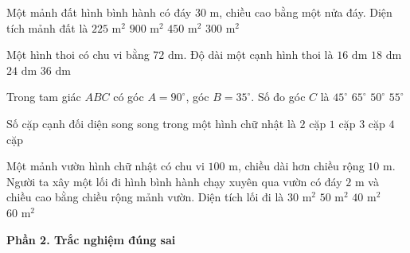 \begin{ex} %
Một mảnh đất hình bình hành có đáy $30\text{ m}$, chiều cao bằng một nửa đáy. Diện tích mảnh đất là
\choice
{$225\text{ m}^2$}
{$900\text{ m}^2$}
{\True $450\text{ m}^2$}
{$300\text{ m}^2$}
\end{ex}

\begin{ex} %
Một hình thoi có chu vi bằng $72\text{ dm}$. Độ dài một cạnh hình thoi là
\choice
{$16\text{ dm}$}
{\True $18\text{ dm}$}
{$24\text{ dm}$}
{$36\text{ dm}$}
\end{ex}

\begin{ex} %
Trong tam giác $ABC$ có góc $A = 90^\circ$, góc $B = 35^\circ$. Số đo góc $C$ là
\choice
{$45^\circ$}
{$65^\circ$}
{$50^\circ$}
{\True $55^\circ$}
\end{ex}

\begin{ex} %
Số cặp cạnh đối diện song song trong một hình chữ nhật là
\choice
{\True $2$ cặp}
{$1$ cặp}
{$3$ cặp}
{$4$ cặp}
\end{ex}

\begin{ex} %
Một mảnh vườn hình chữ nhật có chu vi $100\text{ m}$, chiều dài hơn chiều rộng $10\text{ m}$. Người ta xây một lối đi hình bình hành chạy xuyên qua vườn có đáy $2\text{ m}$ và chiều cao bằng chiều rộng mảnh vườn. Diện tích lối đi là
\choice
{$30\text{ m}^2$}
{$50\text{ m}^2$}
{\True $40\text{ m}^2$}
{$60\text{ m}^2$}
\end{ex}

\textbf{Phần 2. Trắc nghiệm đúng sai}

